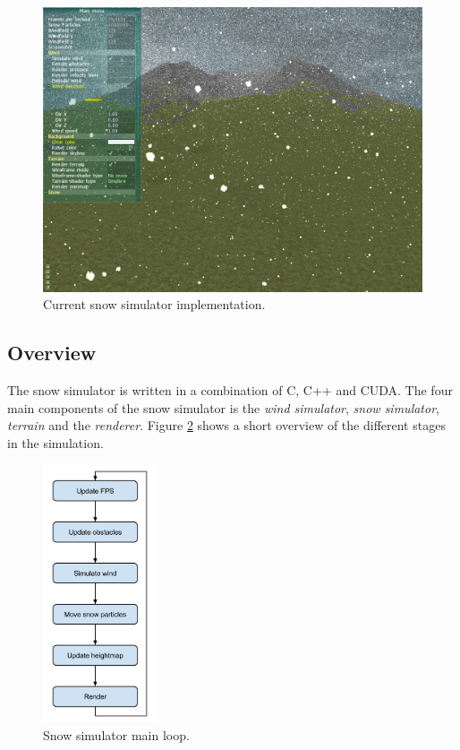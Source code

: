 \begin{figure}[ht]
	\center
	\includegraphics[width=1.0\textwidth]{images/snow/gpu/snow7}
	\caption{Current snow simulator implementation.}
	\label{fig:gpuSnow}
\end{figure}

\subsection{Overview}

The snow simulator is written in a combination of C, C++ and CUDA.
The four main components of the snow simulator is the \emph{wind simulator}, 
\emph{snow simulator}, \emph{terrain} and the \emph{renderer}. Figure \ref{fig:mainLoop} 
shows a short overview of the different stages in the simulation. 

\begin{figure}[ht]
	\center
	\includegraphics[width=0.30\textwidth]{images/snow_sim_main_loop}
	\caption{Snow simulator main loop.}
	\label{fig:mainLoop}
\end{figure}

